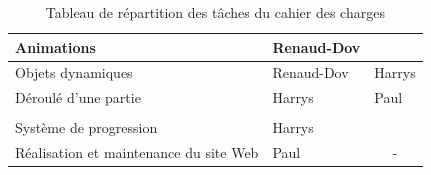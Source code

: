 \begin{table}[!htb]
\begin{center}
\begin{tabular}{|l|l|l|}
                        Animations                             & \cellcolor[HTML]{34FF34}Renaud-Dov &                                    \\ \hline
                        Objets dynamiques                      & \cellcolor[HTML]{34FF34}Renaud-Dov & \cellcolor[HTML]{F8A102}Harrys     \\ \hline
                        Déroulé d'une partie                   & \cellcolor[HTML]{F8A102}Harrys     & \cellcolor[HTML]{9698ED}Paul       \\ \hline
                        \multicolumn{3}{|l|}{\cellcolor[HTML]{343434}{\color[HTML]{FFFFFF} \textbf{Autre}}}                              \\ \hline
                        Système de progression                 & \cellcolor[HTML]{F8A102}Harrys     &                                    \\ \hline
                        Réalisation et maintenance du site Web & \cellcolor[HTML]{9698ED}Paul       & \multicolumn{1}{c|}{-}             \\ \hline
                    \end{tabular}
                \end{center}
                \caption{Tableau de répartition des tâches du cahier des charges}
            \end{table}
            
